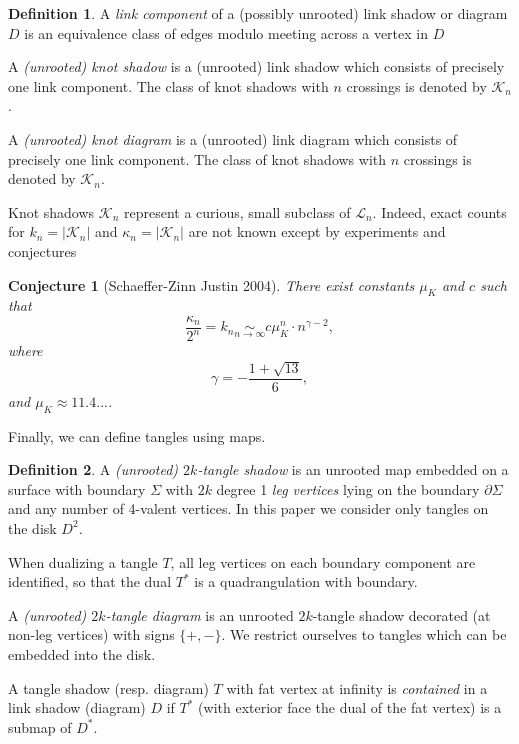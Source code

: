 \documentclass[amsmath,longbibliography,secnumarabic,floatfix,amssymb,nofootinbib,nobibnotes,letterpaper,11pt,tightenlines,notitlepage,showkeys,showlabels]{amsart}%
\newcommand{\KnotDia}{\mathcal{K}}
\newcommand{\knotdia}{\kappa}
\newcommand{\FlatKnotDia}{\mathscr{K}}
\newcommand{\KnotShad}{\FlatKnotDia}
\newcommand{\knotshad}{k}
\newcommand{\knotgrowth}{\mu_K}
\newcommand{\LinkShad}{\mathscr{L}}
\newtheorem*{conjecture}{Conjecture}
\theoremstyle{definition}
\newtheorem*{definition}{Definition}
\begin{document}
\begin{definition}
  A \emph{link component} of a (possibly unrooted) link shadow or
  diagram $D$ is an equivalence class of edges modulo meeting across a
  vertex in $D$

  A \emph{(unrooted) knot shadow} is a (unrooted) link shadow which
  consists of precisely one link component. The class of knot
  shadows with $n$ crossings is denoted by $\KnotShad_n$.

  A \emph{(unrooted) knot diagram} is a (unrooted) link diagram which
  consists of precisely one link component. The class of knot
  shadows with $n$ crossings is denoted by $\KnotDia_n$.
\end{definition}

Knot shadows $\KnotShad_n$ represent a curious, small
subclass of $\LinkShad_n$. Indeed, exact counts for $\knotshad_n =
|\KnotShad_n|$ and $\knotdia_n = |\KnotDia_n|$ are
not known except by experiments and conjectures\cite{PZJasympconj2004}

\begin{conjecture}[Schaeffer-Zinn Justin 2004]
  There exist constants $\knotgrowth$ and $c$ such that
  \[\frac{\knotdia_n}{2^n} = \knotshad_n \mathop{\sim}\limits_{n \to \infty} c\knotgrowth^n \cdot
  n^{\gamma - 2},\]
  where
  \[\gamma = -\frac{1 + \sqrt{13}}{6},\]
  and $\knotgrowth \approx 11.4...$.
\end{conjecture}

Finally, we can define tangles using maps.

\begin{definition}
  A \emph{(unrooted) $2k$-tangle shadow} is an unrooted map embedded
  on a surface with boundary $\Sigma$ with $2k$ degree 1 \emph{leg
    vertices} lying on the boundary $\partial \Sigma$ and any number
  of 4-valent vertices. In this paper we consider only tangles on the
  disk $D^2$.

  When dualizing a tangle $T$, all leg vertices on each boundary component
  are identified, so that the dual $T^*$ is a quadrangulation with boundary.

  A \emph{(unrooted) $2k$-tangle diagram} is an unrooted $2k$-tangle
  shadow decorated (at non-leg vertices) with signs $\{+,-\}$. We
  restrict ourselves to tangles which can be embedded into the disk.

  A tangle shadow (resp. diagram) $T$ with fat vertex at infinity is
  \emph{contained} in a link shadow (diagram) $D$ if $T^*$ (with
  exterior face the dual of the fat vertex) is a submap of $D^*$.
\end{definition}
\end{document}
